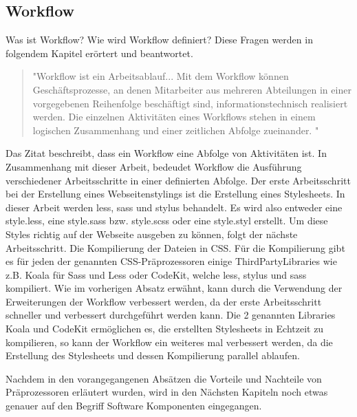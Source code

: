 \subsection{Workflow}
Was ist Workflow? Wie wird Workflow definiert?\newline
Diese Fragen werden in folgendem Kapitel erörtert und beantwortet.\newline
\begin{quote}
"Workflow ist ein Arbeitsablauf... Mit dem Workflow können Geschäftsprozesse, an denen Mitarbeiter aus mehreren Abteilungen in einer vorgegebenen Reihenfolge beschäftigt sind, informationstechnisch realisiert werden. Die einzelnen Aktivitäten eines Workflows stehen in einem logischen Zusammenhang und einer zeitlichen Abfolge zueinander. "
\autocite[]{ITWissen.info.2014}
\end{quote}
Das Zitat beschreibt, dass ein Workflow eine Abfolge von Aktivitäten ist. In Zusammenhang mit dieser Arbeit, bedeudet Workflow die Ausführung verschiedener Arbeitsschritte in einer definierten Abfolge.\newline
Der erste Arbeitsschritt bei der Erstellung eines Webseitenstylings ist die Erstellung eines Stylesheets. In dieser Arbeit werden less, sass und stylus behandelt. Es wird also entweder eine style.less, eine style.sass bzw. style.scss oder eine style.styl erstellt. \newline
Um diese Styles richtig auf der Webseite ausgeben zu können, folgt der nächste Arbeitsschritt. Die Kompilierung der Dateien in CSS.\newline
Für die Kompilierung gibt es für jeden der genannten CSS-Präprozessoren einige ThirdPartyLibraries wie z.B. Koala für Sass und Less oder CodeKit, welche less, stylus und sass kompiliert. \newline
Wie im vorherigen Absatz erwähnt, kann durch die Verwendung der Erweiterungen der Workflow verbessert werden, da der erste Arbeitsschritt schneller und verbessert durchgeführt werden kann. \newline
Die 2 genannten Libraries Koala und CodeKit ermöglichen es, die erstellten Stylesheets in Echtzeit zu kompilieren, so kann der Workflow ein weiteres mal verbessert werden, da die Erstellung des Stylesheets und dessen Kompilierung parallel ablaufen.

Nachdem in den vorangegangenen Absätzen die Vorteile und Nachteile von Präprozessoren erläutert wurden, wird in den Nächsten Kapiteln noch etwas genauer auf den Begriff \glqq{} Software Komponenten \grqq{} eingegangen.
